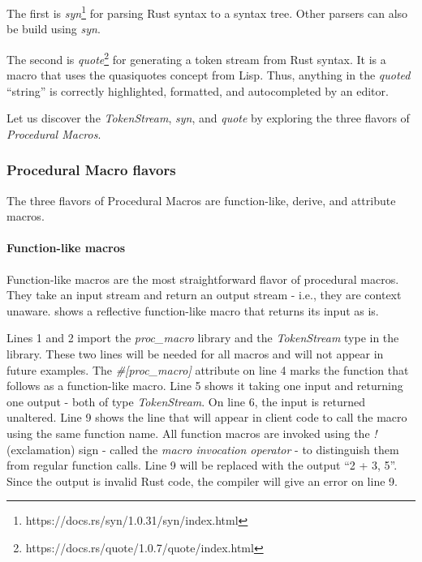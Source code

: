 The first is \textit{syn}\footnote{https://docs.rs/syn/1.0.31/syn/index.html} for parsing Rust syntax to a syntax tree.
Other parsers can also be build using \textit{syn}.

The second is \textit{quote}\footnote{https://docs.rs/quote/1.0.7/quote/index.html} for generating a token stream from Rust syntax.
It is a macro that uses the quasiquotes concept from Lisp.
Thus, anything in the \textit{quoted} ``string'' is correctly highlighted, formatted, and autocompleted by an editor.

Let us discover the \textit{TokenStream}, \textit{syn}, and \textit{quote} by exploring the three flavors of \textit{Procedural Macros}.

\subsubsection{Procedural Macro flavors}

The three flavors of Procedural Macros are function-like, derive, and attribute macros.

\paragraph{Function-like macros}
Function-like macros are the most straightforward flavor of procedural macros.
They take an input stream and return an output stream - i.e., they are context unaware.
 shows a reflective function-like macro that returns its input as is.


Lines 1 and 2 import the \textit{proc\_macro} library and the \textit{TokenStream} type in the library.
These two lines will be needed for all macros and will not appear in future examples.
The \textit{\#[proc\_macro]} attribute on line 4 marks the function that follows as a function-like macro.
Line 5 shows it taking one \colorbox{input}{input} and returning one \colorbox{output}{output} - both of type \textit{TokenStream}.
On line 6, the input is returned unaltered.
Line 9 shows the line that will appear in client code to call the macro using the same \colorbox{function}{function name}.
All function macros are invoked using the \textit{!} (exclamation) sign - called the \textit{macro invocation operator} - to distinguish them from regular function calls.
Line 9 will be replaced with the \colorbox{output}{output} ``2 + 3, 5''.
Since the output is invalid Rust code, the compiler will give an error on line 9.

